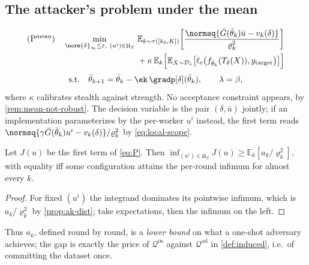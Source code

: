 \subsection{The attacker's problem under the mean}
\label{sec:attacker-problem}

\begin{equation}
\begin{aligned}
(\mathrm{P}^{\mathrm{mean}})\quad
\min_{\norm{\delta}_\infty\le\varepsilon,\ (u^i)\in\mathfrak{U}_\beta}\
&\mathbb{E}_{k\sim\tau([k_0,K])}\!\left[\frac{\normsq{\bar G(\bar\theta_k)\bar u-v_k(\delta)}}{\varrho_k^{2}}\right]\\
&+\kappa\,\mathbb{E}_{k}\Big[\mathbb{E}_{X\sim\mathcal{D}_s}\big[\ell_c\big(f_{\bar\theta_k}(T_\delta(X)),y_{\mathrm{target}}\big)\big]\Big]
\end{aligned}
\label{eq:P}
\end{equation}
\begin{equation*}
\text{s.t.}\quad
\bar\theta_{k+1}=\bar\theta_k-\ek\,\gradp[\delta](\bar\theta_k),
\qquad
\lambda=\beta ,
\end{equation*}
where $\kappa$ calibrates stealth against strength. No acceptance constraint appears, by
\cref{rem:mean-not-robust}. The decision variable is the pair $(\delta,\bar u)$ jointly; if an
implementation parameterizes by the per-worker $u^i$ instead, the first term reads
$\normsq{\gamma\bar G(\bar\theta_k)u^i-v_k(\delta)}/\varrho_k^2$ by \cref{eq:local-scope}.

\begin{proposition}
\label{prop:oneshot-gap}
Let $J(u)$ be the first term of \cref{eq:P}. Then $\inf_{(u^i)\in\mathfrak{U}_\beta}J(u)\ge\mathbb{E}_k[a_k/\varrho_k^2]$, with equality iff some configuration attains the per-round infimum for almost every $k$.
\end{proposition}
\begin{proof}
For fixed $(u^i)$ the integrand dominates its pointwise infimum, which is $a_k/\varrho_k^2$ by \cref{prop:ak-dist}; take expectations, then the infimum on the left.
\end{proof}

Thus $a_k$, defined round by round, is a \emph{lower bound} on what a one-shot adversary
achieves; the gap is exactly the price of $\mathcal{Q}^{\mathrm{os}}$ against
$\mathcal{Q}^{\mathrm{ad}}$ in \cref{def:induced}, i.e.\ of committing the dataset once.

